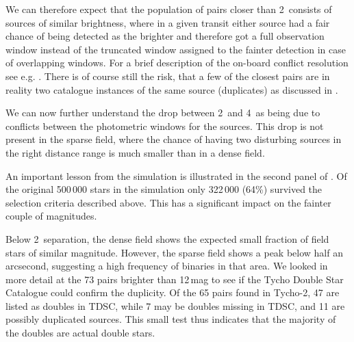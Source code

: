 We can therefore expect that the population of pairs closer than 2\arcsec\
consists of sources of similar brightness, where in a given transit either
source had a fair chance of being detected as the brighter and therefore got a
full observation window instead of the truncated window assigned to the fainter
detection in case of overlapping windows. 
For a brief description of the on-board conflict resolution see e.g.
\citet[][Sect.\ 2]{DPACP-7}.
There is of course still the risk, that a few of the closest pairs are in
reality two catalogue instances of the same source (duplicates) as discussed in
\secref{sec:duplicates}. 

We can now further understand the drop between 2\arcsec\ and 4\arcsec\ as being
due to conflicts between the photometric windows for the sources. This drop is
not present in the sparse field, where the chance of having two disturbing
sources in the right distance range is much smaller than in a dense field.

An important lesson from the simulation is illustrated in the second panel
of \figref{fig:942_simul}. Of the original 500\,000 stars in the simulation
only 322\,000 (64\%) survived the selection criteria described above. 
This has a significant impact on the fainter couple of magnitudes.

Below 2\arcsec\ separation, the dense field shows the expected small fraction of
field stars of similar magnitude. However, the sparse field shows a peak below
half an arcsecond, suggesting a high frequency of binaries in that area. We
looked in more detail at the 73 pairs brighter than 12\,mag to see if the Tycho 
Double Star Catalogue \citep[TDSC,][]{2002A&A...384..180F} could confirm 
the duplicity. Of the 65 pairs found in Tycho-2, 
47 are listed as doubles in TDSC, while 7 may be doubles missing in TDSC,
and 11 are possibly duplicated {\gaia} sources. 
This small test thus indicates that the majority of the {} doubles are
actual double stars. 



